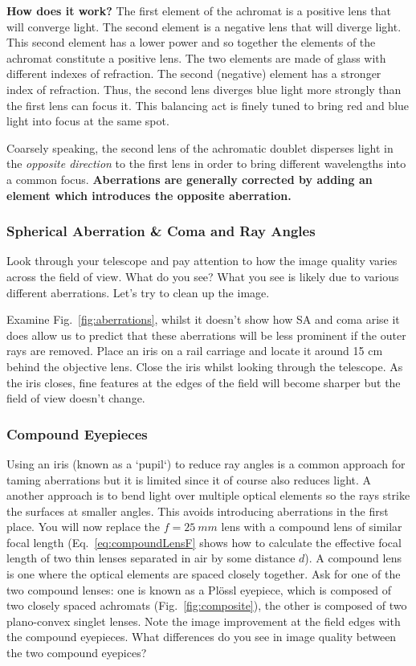 \documentclass[a4paper]{report}
\begin{document}
\textbf{How does it work?} 
The first element of the achromat is a positive lens that will converge light. 
The second element is a negative lens that will diverge light.
This second element has a lower power and so together the elements of the achromat constitute a positive lens. 
The two elements are made of glass with different indexes of refraction. 
The second (negative) element has a stronger index of refraction. 
Thus, the second lens diverges blue light more strongly than the first lens can focus it.
This balancing act is finely tuned to bring red and blue light into focus at the same spot.

Coarsely speaking, the second lens of the achromatic doublet disperses light in the \textit{opposite direction} to the first lens in order to bring different wavelengths into a common focus. 
\textbf{Aberrations are generally corrected by adding an element which introduces the opposite aberration.}






\subsubsection{Spherical Aberration \& Coma and Ray Angles}
Look through your telescope and pay attention to how the image quality varies across the field of view. 
What do you see?
What you see is likely due to various different aberrations. 
Let's try to clean up the image. 

Examine Fig.~\ref{fig:aberrations}, whilst it doesn't show how SA and coma arise it does allow us to predict that these aberrations will be less prominent if the outer rays are removed. 
Place an iris on a rail carriage and locate it around 15 cm behind the objective lens. 
Close the iris whilst looking through the telescope. 
As the iris closes, fine features at the edges of the field will become sharper but the field of view doesn't change. 




\subsubsection{Compound Eyepieces}
Using an iris (known as a `pupil`) to reduce ray angles is a common approach for taming aberrations but it is limited since it of course also reduces light. 
A another approach is to bend light over multiple optical elements so the rays strike the surfaces at smaller angles. 
This avoids introducing aberrations in the first place. 
You will now replace the $f=25~mm$ lens with a compound lens of similar focal length (Eq.~\ref{eq:compoundLensF} shows how to calculate the effective focal length of two thin lenses separated in air by some distance $d$). 
A compound lens is one where the optical elements are spaced closely together. 
Ask for one of the two compound lenses: one is known as a Pl\"{o}ssl eyepiece, which is composed of two closely spaced achromats (Fig.~\ref{fig:composite}), the other is composed of two plano-convex singlet lenses. 
Note the image improvement at the field edges with the compound eyepieces. 
What differences do you see in image quality between the two compound eyepices?
\end{document}
